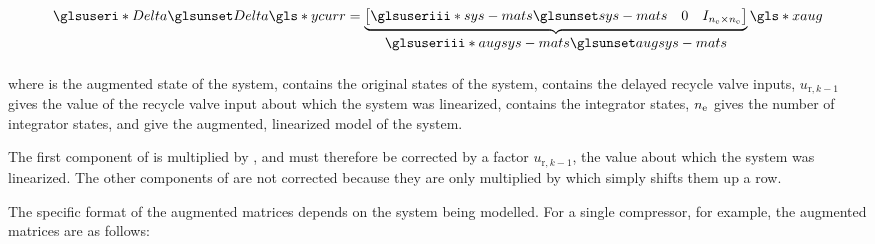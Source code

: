 \begin{equation}
\begin{split}
    \gi{Delta} \g{ycurr} & = \ubrace{\begin{bmatrix}
      \gc{sys-mats} & 0 & I_{n\ut{e} \times n\ut{e}}
    \end{bmatrix}}{\gc{augsys-mats}}
    \g{xaug}\\[0.5em]
  \end{split}
  \label{eq:mpc:augmented-state-eqs}
\end{equation}

\noindent where  is the augmented state of the system, 
 contains the original states of the system, 
 contains the delayed recycle valve inputs,
$u_{\text{r},k-1}$ gives the value of the recycle valve input about which the system was linearized,
 contains the integrator states,
$n_\text{e}$ gives the number of integrator states,
and  give the augmented, linearized model of the system.

The first component of   is multiplied by , and must therefore be corrected by a factor $u_{\text{r},k-1}$, the value about which the system was linearized. 
The other components of  are not corrected because they are only multiplied by  which simply shifts them up a row.

The specific format of the augmented matrices depends on the system being modelled. For a single compressor, for example, the augmented matrices are as follows:

